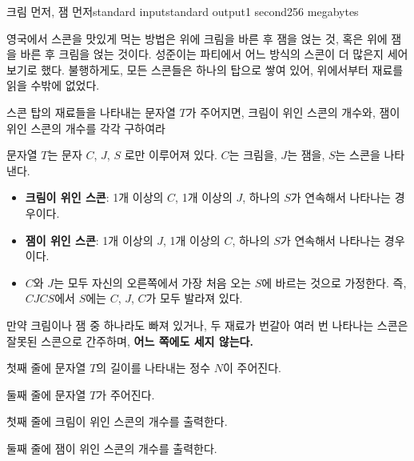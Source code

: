 \begin{problem}{크림 먼저, 잼 먼저}{standard input}{standard output}{1 second}{256 megabytes}

영국에서 스콘을 맛있게 먹는 방법은 위에 크림을 바른 후 잼을 얹는 것, 혹은 위에 잼을 바른 후 크림을 얹는 것이다. 성준이는 파티에서 어느 방식의 스콘이 더 많은지 세어 보기로 했다. 불행하게도, 모든 스콘들은 하나의 탑으로 쌓여 있어, 위에서부터 재료를 읽을 수밖에 없었다.

스콘 탑의 재료들을 나타내는 문자열 $T$가 주어지면, 크림이 위인 스콘의 개수와, 잼이 위인 스콘의 개수를 각각 구하여라

문자열 $T$는 문자 $C$, $J$, $S$ 로만 이루어져 있다. $C$는 크림을, $J$는 잼을, $S$는 스콘을 나타낸다.

\begin{itemize}
  \item \textbf{크림이 위인 스콘}: 1개 이상의 $C$, 1개 이상의 $J$, 하나의 $S$가 연속해서 나타나는 경우이다.
  \item \textbf{잼이 위인 스콘}: 1개 이상의 $J$, 1개 이상의 $C$, 하나의 $S$가 연속해서 나타나는 경우이다.
  \item $C$와 $J$는 모두 자신의 오른쪽에서 가장 처음 오는 $S$에 바르는 것으로 가정한다. 즉, $CJCS$에서 $S$에는 $C$, $J$, $C$가 모두 발라져 있다.
\end{itemize}

만약 크림이나 잼 중 하나라도 빠져 있거나, 두 재료가 번갈아 여러 번 나타나는 스콘은 잘못된 스콘으로 간주하며, \textbf{어느 쪽에도 세지 않는다.}



\InputFile
첫째 줄에 문자열 $T$의 길이를 나타내는 정수 $N$이 주어진다.

둘째 줄에 문자열 $T$가 주어진다.

\OutputFile
첫째 줄에 크림이 위인 스콘의 개수를 출력한다.

둘째 줄에 잼이 위인 스콘의 개수를 출력한다.

\Examples

\begin{example}
%
%
%
%
\end{example}

\end{problem}

